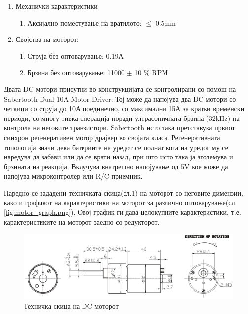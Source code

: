 \documentclass[12pt]{article}
\begin{document}
\begin{enumerate}
\begin{enumerate}
\begin{enumerate}
                \end{enumerate}
            \end{enumerate}
	      \item Механички карактеристики
          \begin{enumerate}
            \item Аксијално поместување на вратилото: $\leq$ 0.5mm
            \end{enumerate}
        \item Својства на моторот:
          \begin{enumerate}
            \item Струја без оптоварување: 0.19А
            \item Брзина без оптоварување: 11000 $\pm$ 10 \% RPM


            \end{enumerate}
        \end{enumerate}

		  Двата DC мотори присутни во конструкцијата се контролирани со помош на Sabertooth Dual 10A Motor Driver. Тој може да напојува два DC мотори со четкици со струја до 10А поединечно, со максимални 15А за кратки временски периоди, со многу тивка операција поради ултрасоничната брзина (32kHz) на контрола на неговите транзистори. Sabertooth исто така претставува првиот синхрон регенеративен мотор драјвер во својата класа. Регенеративната топологија значи дека батериите на уредот се полнат кога на уредот му се наредува да забави или да се врати назад, при што исто така ја зголемува и брзината на реакција. Вклучува внатрешно напојување од 5V кое може да напојува микроконтролер или R/C приемник.

		  Наредно се зададени техничката скица(сл.\ref{fig:motor_schematic.png}) на моторот со неговите димензии, како и графикот на карактеристики на моторот за различно оптоварување(сл.\ref{fig:motor_graph.png}). Овој график ги дава целокупните карактеристики, т.е. карактеристиките на моторот заедно со редукторот.

      \begin{figure}[H]
        \includegraphics[width=0.75\linewidth]{./images/motor_schematic.png}
		    \centering
        \caption{Техничка скица на DC моторот}
		    \label{fig:motor_schematic.png}
		    \end{figure}
\end{document}

